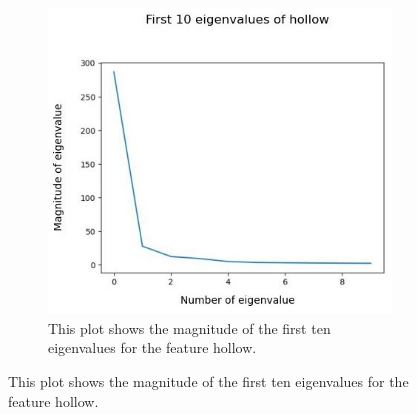 
\begin{figure}[!h]
	\centering
	\begin{subfigure}{0.7\textwidth}
		\includegraphics[width=0.9\linewidth]{Figures/chapter04/pca_hollow_graph.png} 
		\caption{This plot shows the magnitude of the first ten eigenvalues for the feature hollow.}
	\end{subfigure}
	\vspace{20pt}
	

\end{figure}
